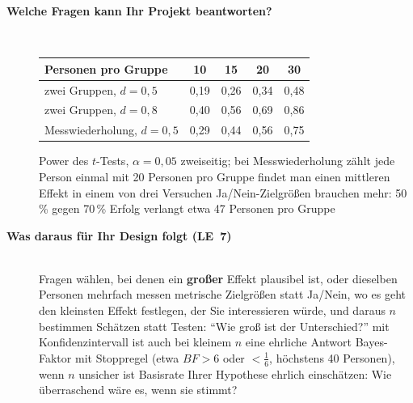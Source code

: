 \begin{description}
\item[{\rot\bf Welche Fragen kann Ihr Projekt beantworten?}]~\\[-\lblskip]
\begin{center}
\small
\begin{tabular}{@{}lcccc@{}}
\toprule
\textbf{Personen pro Gruppe} & 10 & 15 & 20 & 30 \\
\midrule
zwei Gruppen, $d=0{,}5$ & 0,19 & 0,26 & 0,34 & 0,48 \\
zwei Gruppen, $d=0{,}8$ & 0,40 & 0,56 & 0,69 & 0,86 \\
Messwiederholung, $d=0{,}5$ & 0,29 & 0,44 & 0,56 & 0,75 \\
\bottomrule
\end{tabular}
\end{center}
\bi
  \ite Power des $t$-Tests, $\alpha=0{,}05$ zweiseitig; bei
    Messwiederholung zählt jede Person einmal
  \ite mit 20 Personen pro Gruppe findet man einen mittleren Effekt in
    einem von drei Versuchen
  \ite Ja/Nein-Zielgrößen brauchen mehr: 50\,\% gegen 70\,\% Erfolg
    verlangt etwa 47 Personen pro Gruppe
\ei
{}
\os{\newpage}

\item[{\rot\bf Was daraus für Ihr Design folgt (LE~7)}]~\\[-\lblskip]
\bi
  \ite Fragen wählen, bei denen ein \textbf{großer} Effekt plausibel ist,
    oder dieselben Personen mehrfach messen
  \ite metrische Zielgrößen statt Ja/Nein, wo es geht
  \ite den kleinsten Effekt festlegen, der Sie interessieren würde, und
    daraus $n$ bestimmen
  \ite Schätzen statt Testen: \enquote{Wie groß ist der Unterschied?}
    mit Konfidenzintervall ist auch bei kleinem $n$ eine ehrliche Antwort
  \ite Bayes-Faktor mit Stoppregel (etwa $\mathit{BF}>6$ oder
    $<\tfrac16$, höchstens 40 Personen), wenn $n$ unsicher ist
  \ite Basisrate Ihrer Hypothese ehrlich einschätzen: Wie überraschend
    wäre es, wenn sie stimmt?
\ei
{}
\os{\newpage}
\end{description}

